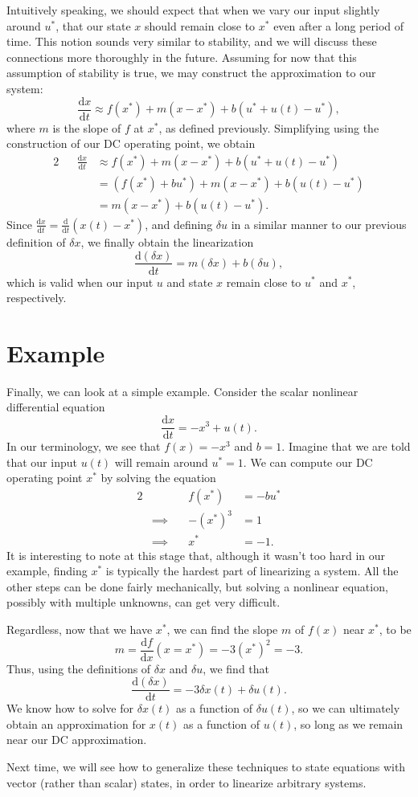 \documentclass[letterpaper]{article}
\theoremstyle{remark}
\newcommand{\dx}{\mathrm{d}x}
\newcommand{\dt}{\mathrm{d}t}
\newcommand{\diff}{\mathrm{d}}
\newcommand{\df}{\mathrm{d}f}
\newcommand{\eqn}[1]{\begin{alignat*}{2}#1\end{alignat*}}
\newcommand*{\thus}{&\implies\quad&}
\begin{document}
Intuitively speaking, we should expect that when we vary our input slightly around $u^*$, that our state $x$ should remain close to $x^*$ even after a long period of time. This notion sounds very similar to stability, and we will discuss these connections more thoroughly in the future. Assuming for now that this assumption of stability is true, we may construct the approximation to our system:
\[
    \frac{\dx}{\dt} \approx f(x^*) + m(x - x^*) + b(u^* + u(t) - u^*),
\]
where $m$ is the slope of $f$ at $x^*$, as defined previously. Simplifying using the construction of our DC operating point, we obtain
\eqn{
    && \frac{\dx}{\dt} &\approx f(x^*) + m(x - x^*) + b(u^* + u(t) - u^*) \\
    &&&= (f(x^*) + bu^*) + m(x - x^*) + b(u(t) - u^*) \\
    &&&= m(x - x^*) + b(u(t) - u^*).
}
Since $\frac{\dx}{\dt} = \frac{\diff}{\dt}(x(t) - x^*)$, and defining $\delta u$ in a similar manner to our previous definition of $\delta x$, we finally obtain the linearization
\[
    \frac{\diff (\delta x)}{\dt} = m(\delta x) + b(\delta u),
\]
which is valid when our input $u$ and state $x$ remain close to $u^*$ and $x^*$, respectively.

\section{Example}
Finally, we can look at a simple example. Consider the scalar nonlinear differential equation
\[
    \frac{\dx}{\dt} = -x^3 + u(t).
\]
In our terminology, we see that $f(x) = -x^3$ and $b = 1$. Imagine that we are told that our input $u(t)$ will remain around $u^* = 1$. We can compute our DC operating point $x^*$ by solving the equation
\eqn{
    && f(x^*) &= -bu^* \\
    \thus -(x^*)^3 &= 1 \\
    \thus x^* &= -1.
}
It is interesting to note at this stage that, although it wasn't too hard in our example, finding $x^*$ is typically the hardest part of linearizing a system. All the other steps can be done fairly mechanically, but solving a nonlinear equation, possibly with multiple unknowns, can get very difficult.

Regardless, now that we have $x^*$, we can find the slope $m$ of $f(x)$ near $x^*$, to be
\[
    m = \frac{\df}{\dx}(x = x^*) = -3(x^*)^2 = -3.
\]
Thus, using the definitions of $\delta x$ and $\delta u$, we find that
\[
    \frac{\diff (\delta x)}{\dt} = -3\delta x(t) + \delta u(t).
\]
We know how to solve for $\delta x(t)$ as a function of $\delta u(t)$, so we can ultimately obtain an approximation for $x(t)$ as a function of $u(t)$, so long as we remain near our DC approximation.

Next time, we will see how to generalize these techniques to state equations with vector (rather than scalar) states, in order to linearize arbitrary systems.
\end{document}
